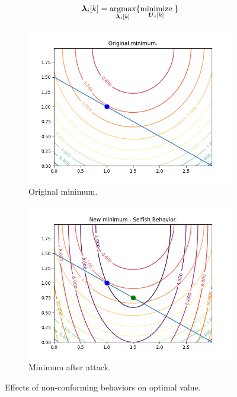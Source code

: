 \documentclass[../main.tex]{subfiles}
\begin{document}
\begin{equation}
  \begin{matrix}
    \lambdaik=\underset{\lambdaik}{\mathrm{argmax}}\{\underset{\vec{U}_i[k]}{\mathrm{minimize}}\;\}\\
  \end{matrix}
\end{equation}

\begin{figure}[h]
  \centering
  \begin{subfigure}{.45\textwidth}
    \includegraphics[width=\textwidth]{../img/original-minimum.png}
    \caption{Original minimum.}
    \label{fig:first}
  \end{subfigure}
  \hfill
  \begin{subfigure}{0.45\textwidth}
    \includegraphics[width=\textwidth]{../img/new-minimum-selfish.png}
    \caption{Minimum after attack.}
    \label{fig:second}
  \end{subfigure}
  \caption{Effects of non-conforming behaviors on optimal value. }
  \label{fig:figures}
\end{figure}
\end{document}
